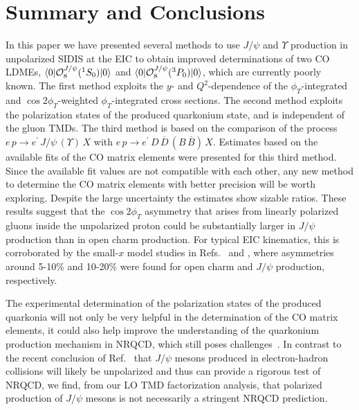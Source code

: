 \documentclass[prd,aps,preprintnumbers,nofootinbib,superscriptaddress]{revtex4}
\newcommand{\sT}{{\scriptscriptstyle T}}
\begin{document}
\section{Summary and Conclusions \label{sec:conc}}
In this paper we have presented several methods to use $J/\psi$ and $\Upsilon$ production in unpolarized SIDIS at the EIC to obtain improved determinations of two CO LDMEs, $\langle0\vert{\cal O}_{8}^{J/\psi}(^{1}S_{0})\vert0\rangle$ and $\langle0\vert{\cal O}_{8}^{J/\psi}(^{3}P_{0})\vert0 \rangle$, which are currently poorly known. The first method exploits the $y$- and $Q^2$-dependence of the $\phi_\sT$-integrated and $\cos 2\phi_\sT$-weighted $\phi_\sT$-integrated cross sections. The second method exploits the polarization states of the produced quarkonium state, and is independent of the gluon TMDs. The third method is based on the comparison of the process $ e\,p \to e^\prime \,J/\psi \,(\Upsilon)\,X$ with $e\, p \to e^\prime \,D \,\overline{D}\, (B \,\overline{B})\, X$. Estimates based on the available fits of the CO matrix elements were presented for this third method. Since the available fit values are not compatible with each other, any new method to determine the CO matrix elements with better precision will be worth exploring. Despite the large uncertainty the estimates show sizable ratios. These results suggest that the $\cos 2\phi_T$ asymmetry that arises from linearly polarized gluons inside the unpolarized proton could be substantially larger in $J/\psi$ production than in open charm production. For typical EIC kinematics, this is corroborated by the small-$x$ model studies in Refs.~\cite{Boer:2016fqd} and \cite{Bacchetta:2018ivt}, where asymmetries around 5-10\%  and 10-20\% were found for open charm and $J/\psi$ production, respectively.

The experimental determination of the polarization states of the produced quarkonia will not only be very helpful in the determination of the CO matrix elements, it could also help improve the understanding of the quarkonium production mechanism in NRQCD, which still poses challenges~\cite{Brambilla:2010cs,Andronic:2015wma,Lansberg:2019adr}. In contrast to the recent conclusion of Ref.~\cite{Qiu:2020xum} that $J/\psi$ mesons produced in electron-hadron collisions will likely be unpolarized and thus can provide a rigorous test of NRQCD, we find,  from our LO TMD factorization analysis, that polarized production of $J/\psi$ mesons is not necessarily a stringent NRQCD prediction.
\end{document}
